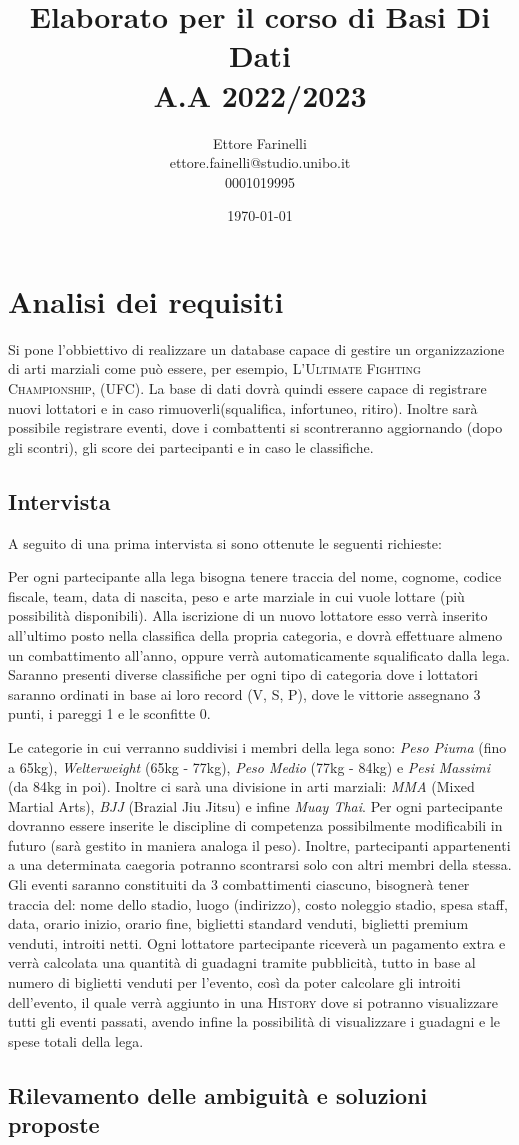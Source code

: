 \documentclass[a4paper,12pt]{report}
\title{\textbf{Elaborato per il corso di Basi Di Dati \\ A.A 2022/2023}}
\author{Ettore Farinelli \\ ettore.fainelli@studio.unibo.it \\ 0001019995}
\date{\today}
\begin{document}
\maketitle

\tableofcontents

\chapter{Analisi dei requisiti}
Si pone l'obbiettivo di realizzare un database capace di gestire un organizzazione di arti marziali come può essere, 
per esempio, \textsc{L'Ultimate Fighting Championship, (UFC)}. La base di dati dovrà quindi essere capace di registrare 
nuovi lottatori e in caso rimuoverli(squalifica, infortuneo, ritiro). Inoltre sarà possibile registrare eventi, dove 
i combattenti si scontreranno aggiornando (dopo gli scontri), gli score dei partecipanti e in caso le classifiche.

\section{Intervista}
A seguito di una prima intervista si sono ottenute le seguenti richieste:\medskip

Per ogni partecipante alla lega bisogna tenere traccia del nome, cognome, codice fiscale, team, data di nascita, peso e arte 
marziale in cui vuole lottare (più possibilità disponibili). Alla iscrizione di un nuovo lottatore esso verrà inserito all'ultimo 
posto nella classifica della propria categoria, e dovrà effettuare almeno un combattimento all'anno, oppure verrà automaticamente 
squalificato dalla lega. Saranno presenti diverse classifiche per ogni tipo di categoria dove i lottatori saranno ordinati 
in base ai loro record (V, S, P), dove le vittorie assegnano 3 punti, i pareggi 1 e le sconfitte 0.\par
Le categorie in cui verranno suddivisi i membri della lega sono: \textit{Peso Piuma} (fino a 65kg), \textit{Welterweight} 
(65kg - 77kg), \textit{Peso Medio} (77kg - 84kg) e \textit{Pesi Massimi} (da 84kg in poi). Inoltre ci sarà una divisione in 
arti marziali: \textit{MMA} (Mixed Martial Arts), \textit{BJJ} (Brazial Jiu Jitsu) e infine \textit{Muay Thai}. Per ogni 
partecipante dovranno essere inserite le discipline di competenza possibilmente modificabili in futuro (sarà gestito in maniera 
analoga il peso). Inoltre, partecipanti appartenenti a una determinata caegoria potranno scontrarsi solo con altri membri 
della stessa. Gli eventi saranno constituiti da 3 combattimenti ciascuno, bisognerà tener traccia del: nome dello stadio, 
luogo (indirizzo), costo noleggio stadio, spesa staff, data, orario inizio, orario fine, biglietti standard venduti, biglietti 
premium venduti, introiti netti. Ogni lottatore partecipante riceverà un pagamento extra e verrà calcolata una quantità di guadagni 
tramite pubblicità, tutto in base al numero di biglietti venduti per l'evento, così da poter calcolare gli introiti dell'evento, 
il quale verrà aggiunto in una \textsc{History} dove si potranno visualizzare tutti gli eventi passati, 
avendo infine la possibilità di visualizzare i guadagni e le spese totali della lega.

\section{Rilevamento delle ambiguità e soluzioni proposte}
\end{document}
